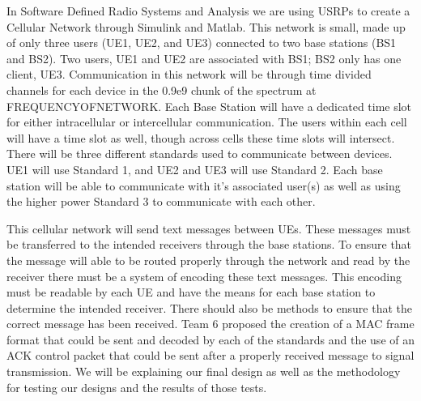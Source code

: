 In Software Defined Radio Systems and Analysis we are using USRPs to create a Cellular Network through Simulink and Matlab. This network is small, made up of only three users (UE1, UE2, and UE3) connected to two base stations (BS1 and BS2). Two users,  UE1 and UE2 are associated with BS1; BS2 only has one client, UE3. Communication in this network will be through time divided channels for each device in the 0.9e9 chunk of the spectrum at FREQUENCYOFNETWORK. Each Base Station will have a dedicated time slot for either intracellular or intercellular communication. The users within each cell will have a time slot as well, though across cells these time slots will intersect. There will be three different standards used to communicate between devices. UE1 will use Standard 1, and UE2 and UE3 will use Standard 2. Each base station will be able to communicate with it's associated user(s) as well as using the higher power Standard 3 to communicate with each other.

This cellular network will send text messages between UEs. These messages must be transferred to the intended receivers through the base stations. To ensure that the message will able to be routed properly through the network and read by the receiver there must be a system of encoding these text messages. This encoding  must be readable by each UE and have the means for each base station to determine the intended receiver. There should also be methods to ensure that the correct message has been received. Team 6 proposed the creation of a MAC frame format that could be sent and decoded by each of the standards and the use of an ACK control packet that could be sent after a properly received message to signal transmission. We will be explaining our final  design as well as the methodology for testing our designs and the results of those tests. 



